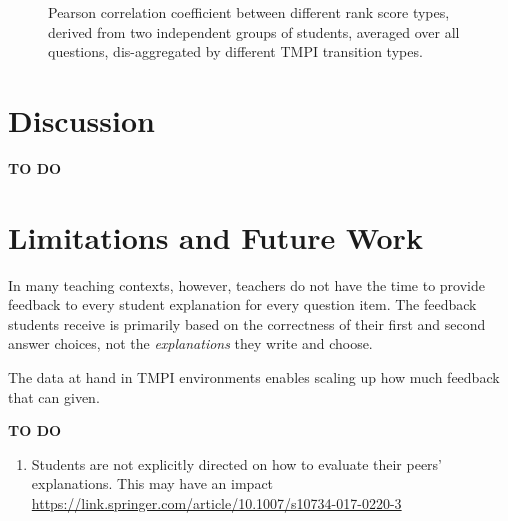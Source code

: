 \documentclass[sigconf]{acmart}
\begin{document}
\begin{figure}
	\scalebox{0.3}{}
	\caption{
		Pearson correlation coefficient between different rank score types, 
		derived from two independent groups of students, averaged over all 
		questions, dis-aggregated by different TMPI transition types.
	}
	\label{fig:acc_by_rank_score_type}
\end{figure}



%	

%






\section{Discussion}
\textbf{TO DO}


\section{Limitations and Future Work}

In many teaching contexts, however, teachers do not have the time to provide 
feedback to every student explanation for every question item. 
The feedback students receive is primarily based on the correctness of their 
first and second answer choices, not the \textit{explanations} they write and 
choose.

The data at hand in TMPI environments enables scaling up how much feedback that 
can given.



\textbf{TO DO}

\begin{enumerate}
	\item Students are not explicitly directed on how to evaluate their peers' 
	explanations. This may have an impact 
	 \url{https://link.springer.com/article/10.1007/s10734-017-0220-3}
\end{enumerate}
\end{document}
